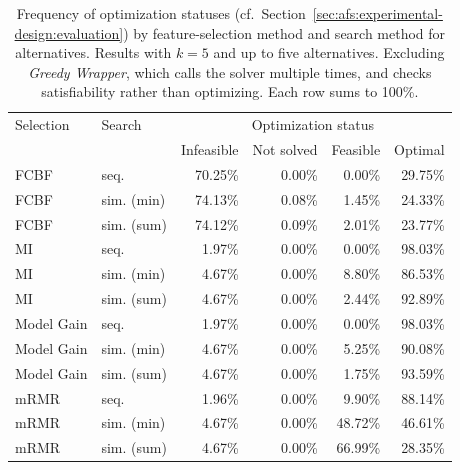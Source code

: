 \documentclass{article}
\theoremstyle{definition}
\begin{document}
\begin{table}[htb]
	\centering
	\begin{tabular}{llrrrr}
		\toprule
		Selection & Search & \multicolumn{4}{c}{Optimization status} \\
		\cmidrule(r){3-6}
		& & Infeasible & Not solved & Feasible & Optimal \\
		\midrule
		FCBF & seq. & 70.25\% & 0.00\% & 0.00\% & 29.75\% \\
		FCBF & sim. (min) & 74.13\% & 0.08\% & 1.45\% & 24.33\% \\
		FCBF & sim. (sum) & 74.12\% & 0.09\% & 2.01\% & 23.77\% \\
		MI & seq. & 1.97\% & 0.00\% & 0.00\% & 98.03\% \\
		MI & sim. (min) & 4.67\% & 0.00\% & 8.80\% & 86.53\% \\
		MI & sim. (sum) & 4.67\% & 0.00\% & 2.44\% & 92.89\% \\
		Model Gain & seq. & 1.97\% & 0.00\% & 0.00\% & 98.03\% \\
		Model Gain & sim. (min) & 4.67\% & 0.00\% & 5.25\% & 90.08\% \\
		Model Gain & sim. (sum) & 4.67\% & 0.00\% & 1.75\% & 93.59\% \\
		mRMR & seq. & 1.96\% & 0.00\% & 9.90\% & 88.14\% \\
		mRMR & sim. (min) & 4.67\% & 0.00\% & 48.72\% & 46.61\% \\
		mRMR & sim. (sum) & 4.67\% & 0.00\% & 66.99\% & 28.35\% \\
		\bottomrule
	\end{tabular}
	\caption{
		Frequency of optimization statuses (cf.~Section~\ref{sec:afs:experimental-design:evaluation}) by feature-selection method and search method for alternatives.
		Results with $k=5$ and up to five alternatives.
		Excluding \emph{Greedy Wrapper}, which calls the solver multiple times, and checks satisfiability rather than optimizing.
		Each row sums to 100\%.
	}
	\label{tab:afs:impact-search-fs-method-optimization-status}
\end{table}
%
\end{document}
